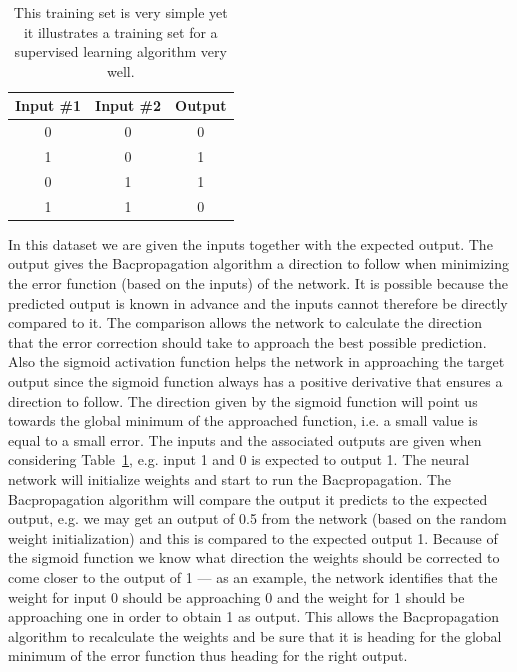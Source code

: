 \begin{table}[H]
\centering  %
\begin{tabular}{c c c} %
Input \#1 & Input \#2 & Output \\ [0.5ex] %
\hline                  %
0 & 0 & 0  \\ %
1 & 0 & 1  \\
0 & 1 & 1  \\
1 & 1 & 0 \\ [1ex] %
\hline %
\end{tabular}
\caption{This training set is very simple yet it illustrates a training set for a supervised learning algorithm very well.} %
\label{table:xor-table} %
\end{table}

In this dataset we are given the inputs together with the expected output. The output gives the Bacpropagation algorithm a direction to follow when minimizing the error function (based on the inputs) of the network. It is possible because the predicted output is known in advance and the inputs cannot therefore be directly compared to it. The comparison allows the network to calculate the direction that the error correction should take to approach the best possible prediction. Also the sigmoid activation function helps the network in approaching the target output since the sigmoid function always has a positive derivative that ensures a direction to follow\cite[p. 153]{rojas1996neural}. The direction given by the sigmoid function will point us towards the global minimum of the approached function, i.e. a small value is equal to a small error. The inputs and the associated outputs are given when considering Table~\ref{table:xor-table}, e.g. input 1 and 0 is expected to output 1. The neural network will initialize weights and start to run the Bacpropagation. The Bacpropagation algorithm will compare the output it predicts to the expected output, e.g. we may get an output of 0.5 from the network (based on the random weight initialization) and this is compared to the expected output 1. Because of the sigmoid function we know what direction the weights should be corrected to come closer to the output of 1 --- as an example, the network identifies that the weight for input 0 should be approaching 0 and the weight for 1 should be approaching one in order to obtain 1 as output. This allows the Bacpropagation algorithm to recalculate the weights and be sure that it is heading for the global minimum of the error function thus heading for the right output.

